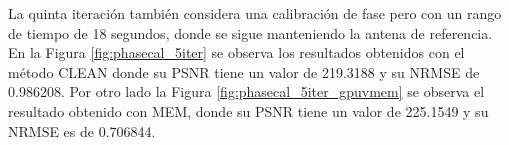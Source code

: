 La quinta iteración también considera una calibración de fase pero con un rango de tiempo de 18 segundos, donde se sigue manteniendo la antena de referencia. En la Figura \ref{fig:phasecal_5iter} se observa los resultados obtenidos con el método CLEAN donde su PSNR tiene un valor de 219.3188 y su NRMSE de 0.986208. Por otro lado la Figura \ref{fig:phasecal_5iter_gpuvmem} se observa el resultado obtenido con MEM, donde su PSNR tiene un valor de 225.1549  y su NRMSE es de 0.706844.

\begin{figure}[!ht]
 \centering
    \vspace{0.3cm}
\end{figure}
